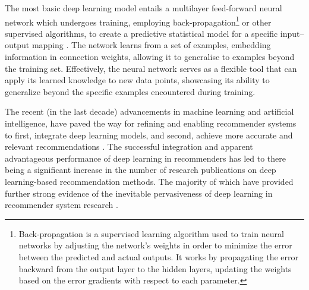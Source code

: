The most basic deep learning model entails a multilayer feed-forward neural network which undergoes training, employing back-propagation\footnote{Back-propagation is a supervised learning algorithm used to train neural networks by adjusting the network's weights in order to minimize the error between the predicted and actual outputs. It works by propagating the error backward from the output layer to the hidden layers, updating the weights based on the error gradients with respect to each parameter.} or other supervised algorithms, to create a predictive statistical model for a specific input–output mapping \cite{zhang2019deep}. The network learns from a set of examples, embedding information in connection weights, allowing it to generalise to examples beyond the training set. Effectively, the neural network serves as a flexible tool that can apply its learned knowledge to new data points, showcasing its ability to generalize beyond the specific examples encountered during training.

The recent (in the last decade) advancements in machine learning and artificial intelligence, have paved the way for refining and enabling recommender systems to first, integrate deep learning models, and second, achieve more accurate and relevant recommendations \cite{he2017neural}. The successful integration and apparent advantageous performance of deep learning in recommenders has led to there being a significant increase in the number of research publications on deep learning-based recommendation methods. The majority of which have provided further strong evidence of the inevitable pervasiveness of deep learning in recommender system research \cite{zhang2019deep}.

